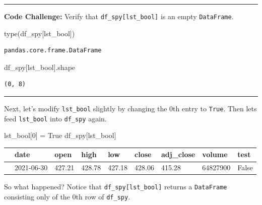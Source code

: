 \documentclass[
  letterpaper,
  DIV=11,
  numbers=noendperiod]{scrreprt}
\newenvironment{Shaded}{\begin{snugshade}}{\end{snugshade}}
\newcommand{\BuiltInTok}[1]{\textcolor[rgb]{0.00,0.23,0.31}{#1}}
\newcommand{\DecValTok}[1]{\textcolor[rgb]{0.68,0.00,0.00}{#1}}
\newcommand{\NormalTok}[1]{\textcolor[rgb]{0.00,0.23,0.31}{#1}}
\newcommand{\OperatorTok}[1]{\textcolor[rgb]{0.37,0.37,0.37}{#1}}
\newcommand{\VariableTok}[1]{\textcolor[rgb]{0.07,0.07,0.07}{#1}}
\begin{document}
\begin{center}\rule{0.5\linewidth}{0.5pt}\end{center}

\textbf{Code Challenge:} Verify that \texttt{df\_spy{[}lst\_bool{]}} is
an empty \texttt{DataFrame}.

\begin{Shaded}
\begin{Highlighting}[]
\BuiltInTok{type}\NormalTok{(df\_spy[lst\_bool])}
\end{Highlighting}
\end{Shaded}

\begin{verbatim}
pandas.core.frame.DataFrame
\end{verbatim}

\begin{Shaded}
\begin{Highlighting}[]
\NormalTok{df\_spy[lst\_bool].shape}
\end{Highlighting}
\end{Shaded}

\begin{verbatim}
(0, 8)
\end{verbatim}

\begin{center}\rule{0.5\linewidth}{0.5pt}\end{center}

Next, let's modify \texttt{lst\_bool} slightly by changing the 0th entry
to \texttt{True}. Then lets feed \texttt{lst\_bool} into
\texttt{df\_spy} again.

\begin{Shaded}
\begin{Highlighting}[]
\NormalTok{lst\_bool[}\DecValTok{0}\NormalTok{] }\OperatorTok{=} \VariableTok{True}
\NormalTok{df\_spy[lst\_bool]}
\end{Highlighting}
\end{Shaded}

\begin{longtable}[]{@{}lllllllll@{}}
\toprule\noalign{}
& date & open & high & low & close & adj\_close & volume & test \\
\midrule\noalign{}
\endhead
\bottomrule\noalign{}
\endlastfoot
0 & 2021-06-30 & 427.21 & 428.78 & 427.18 & 428.06 & 415.28 & 64827900 &
False \\
\end{longtable}

So what happened? Notice that \texttt{df\_spy{[}lst\_bool{]}} returns a
\texttt{DataFrame} consisting only of the 0th row of \texttt{df\_spy}.
\end{document}
